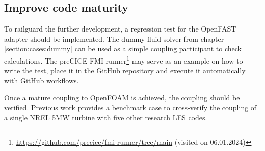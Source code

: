 \begin{comment}
			\item Not sure if you can also set the pressure gradient on the pressure field itself but dont think so
			\item Open: How to do smearing if necessary\\
		\end{itemize}
	\item Additional remark: The OpenFOAM library turbinesFoam\footnote{\url{https://github.com/turbinesFoam/turbinesFoam} (visited 14.12.2023)} \cite{Bachant:2018} might be useful. It implements the actuator line method with different solvers like pimpleFoam in OpenFOAM. The solvers are modified to perform the ALM computation. It is not clear yet how this could be of use, as we want to perform the ALM computation of the turbine to OpenFAST and map the results to OpenFOAM, not do the whole computation in OpenFOAM.
\end{itemize}
\end{comment}

\subsection{Improve code maturity}

To railguard the further development, a regression test for the OpenFAST adapter should be implemented. The dummy fluid solver from chapter \ref{section:cases:dummy} can be used as a simple coupling participant to check calculations. The preCICE-FMI runner\footnote{\url{https://github.com/precice/fmi-runner/tree/main} (visited on 06.01.2024)} may serve as an example on how to write the test, place it in the GitHub repository and execute it automatically with GitHub workflows.

Once a mature coupling to OpenFOAM is achieved, the coupling should be verified. Previous work \cite{Taschner:2022} provides a benchmark case to cross-verify the coupling of a single NREL 5MW turbine with five other research LES codes.
\begin{comment}
\begin{itemize}
	\item Write a regression test (using the dummy fluid solver)
	\item Create a first test case with documentation
	\item Verify simulation results against simulations done with AspFAST and other tools (\cite{Taschner:2022} gives some benchmark cases)\\
\end{itemize}
\end{comment}

